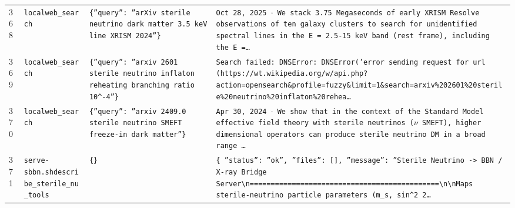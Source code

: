 \documentclass[11pt,a4paper]{article}
\begin{document}
\begin{longtable}{@{}p{}p{}p{}p{}@{}}
368 & \texttt{local}\newline\texttt{web\_\allowbreak{}search} & \texttt{\{''query'':\allowbreak{} ''arXiv sterile neutrino dark matter 3.5 keV line XRISM 2024''\}\allowbreak{}} & \texttt{Oct 28,\allowbreak{} 2025 $\cdot$ We stack 3.75 Megaseconds of early XRISM Resolve observations of ten galaxy clusters to search for unidentified spectral lines in the E =\allowbreak{} 2.5-15 keV band (rest frame)\allowbreak{},\allowbreak{} including the E =\allowbreak{}\ldots{}\allowbreak{}} \\
369 & \texttt{local}\newline\texttt{web\_\allowbreak{}search} & \texttt{\{''query'':\allowbreak{} ''arxiv 2601 sterile neutrino inflaton reheating branching ratio 10\textasciicircum{}\allowbreak{}-4''\}\allowbreak{}} & \texttt{Search failed:\allowbreak{} DNSError:\allowbreak{} DNSError('error sending request for url (https:\allowbreak{}/\allowbreak{}/\allowbreak{}wt.wikipedia.org/\allowbreak{}w/\allowbreak{}api.php?action=\allowbreak{}opensearch\&profile=\allowbreak{}fuzzy\&limit=\allowbreak{}1\&search=\allowbreak{}arxiv\%202601\%20sterile\%20neutrino\%20inflaton\%20rehea\ldots{}\allowbreak{}} \\
370 & \texttt{local}\newline\texttt{web\_\allowbreak{}search} & \texttt{\{''query'':\allowbreak{} ''arxiv 2409.0 sterile neutrino SMEFT freeze-in dark matter''\}\allowbreak{}} & \texttt{Apr 30,\allowbreak{} 2024 $\cdot$ We show that in the context of the Standard Model effective field theory with sterile neutrinos ($\nu$ SMEFT)\allowbreak{},\allowbreak{} higher dimensional operators can produce sterile neutrino DM in a broad range \ldots{}\allowbreak{}} \\
371 & \texttt{serve-sbbn.sh}\newline\texttt{describe\_\allowbreak{}sterile\_\allowbreak{}nu\_\allowbreak{}tools} & \texttt{\{\}\allowbreak{}} & \texttt{\{   ''status'':\allowbreak{} ''ok'',\allowbreak{}   ''files'':\allowbreak{} []\allowbreak{},\allowbreak{}   ''message'':\allowbreak{} ''Sterile Neutrino -\textgreater{}\allowbreak{} BBN /\allowbreak{} X-ray Bridge Server\textbackslash{}\allowbreak{}n=\allowbreak{}=\allowbreak{}=\allowbreak{}=\allowbreak{}=\allowbreak{}=\allowbreak{}=\allowbreak{}=\allowbreak{}=\allowbreak{}=\allowbreak{}=\allowbreak{}=\allowbreak{}=\allowbreak{}=\allowbreak{}=\allowbreak{}=\allowbreak{}=\allowbreak{}=\allowbreak{}=\allowbreak{}=\allowbreak{}=\allowbreak{}=\allowbreak{}=\allowbreak{}=\allowbreak{}=\allowbreak{}=\allowbreak{}=\allowbreak{}=\allowbreak{}=\allowbreak{}=\allowbreak{}=\allowbreak{}=\allowbreak{}=\allowbreak{}=\allowbreak{}=\allowbreak{}=\allowbreak{}=\allowbreak{}=\allowbreak{}=\allowbreak{}=\allowbreak{}=\allowbreak{}=\allowbreak{}=\allowbreak{}=\allowbreak{}=\allowbreak{}\textbackslash{}\allowbreak{}n\textbackslash{}\allowbreak{}nMaps sterile-neutrino particle parameters (m\_\allowbreak{}s,\allowbreak{} sin\textasciicircum{}\allowbreak{}2 2\ldots{}\allowbreak{}} \\

\end{longtable}
\end{document}
